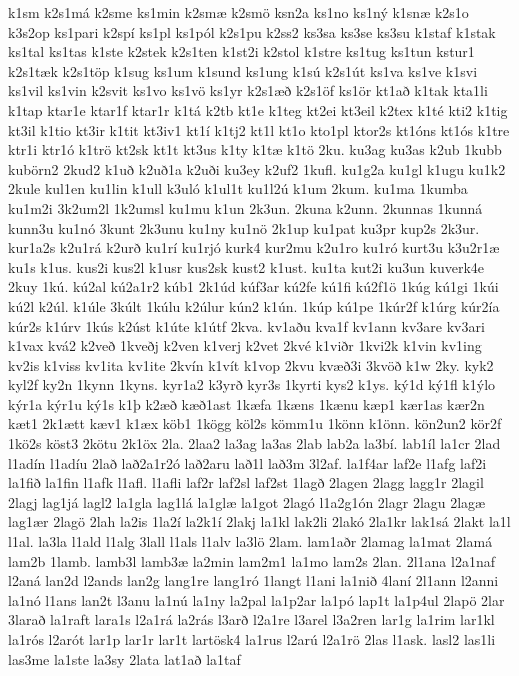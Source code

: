 {k1sm
k2s1má
k2sme
ks1min
k2smæ
k2smö
ksn2a
ks1no
ks1ný
k1snæ
k2s1o
k3s2op
ks1pari
k2spí
ks1pl
ks1pól
k2s1pu
k2ss2
ks3sa
ks3se
ks3su
k1staf
k1stak
ks1tal
ks1tas
k1ste
k2stek
k2s1ten
k1st2i
k2stol
k1stre
ks1tug
ks1tun
kstur1
k2s1tæk
k2s1töp
k1sug
ks1um
k1sund
ks1ung
k1sú
k2s1út
ks1va
ks1ve
k1svi
ks1vil
ks1vin
k2svit
ks1vo
ks1vö
ks1yr
k2s1æð
k2s1öf
ks1ör
kt1að
k1tak
kta1li
k1tap
ktar1e
ktar1f
ktar1r
k1tá
k2tb
kt1e
k1teg
kt2ei
kt3eil
k2tex
k1té
kti2
k1tig
kt3il
k1tio
kt3ir
k1tit
kt3iv1
kt1í
k1tj2
kt1l
kt1o
kto1pl
ktor2s
kt1óns
kt1ós
k1tre
ktr1i
ktr1ó
k1trö
kt2sk
kt1t
kt3us
k1ty
k1tæ
k1tö
2ku.
ku3ag
ku3as
k2ub
1kubb
kubörn2
2kud2
k1uð
k2uð1a
k2uði
ku3ey
k2uf2
1kufl.
ku1g2a
ku1gl
k1ugu
ku1k2
2kule
kul1en
ku1lin
k1ull
k3uló
k1ul1t
ku1l2ú
k1um
2kum.
ku1ma
1kumba
ku1m2i
3k2um2l
1k2umsl
ku1mu
k1un
2k3un.
2kuna
k2unn.
2kunnas
1kunná
kunn3u
ku1nó
3kunt
2k3unu
ku1ny
ku1nö
2k1up
ku1pat
ku3pr
kup2s
2k3ur.
kur1a2s
k2u1rá
k2urð
ku1rí
ku1rjó
kurk4
kur2mu
k2u1ro
ku1ró
kurt3u
k3u2r1æ
ku1s
k1us.
kus2i
kus2l
k1usr
kus2sk
kust2
k1ust.
ku1ta
kut2i
ku3un
kuverk4e
2kuy
1kú.
kú2al
kú2a1r2
kúb1
2k1úd
kúf3ar
kú2fe
kú1fi
kú2f1ö
1kúg
kú1gi
1kúi
kú2l
k2úl.
k1úle
3kúlt
1kúlu
k2úlur
kún2
k1ún.
1kúp
kú1pe
1kúr2f
k1úrg
kúr2ía
kúr2s
k1úrv
1kús
k2úst
k1úte
k1útf
2kva.
kv1aðu
kva1f
kv1ann
kv3are
kv3ari
k1vax
kvá2
k2veð
1kveðj
k2ven
k1verj
k2vet
2kvé
k1viðr
1kvi2k
k1vin
kv1ing
kv2is
k1viss
kv1ita
kv1ite
2kvín
k1vít
k1vop
2kvu
kvæð3i
3kvöð
k1w
2ky.
kyk2
kyl2f
ky2n
1kynn
1kyns.
kyr1a2
k3yrð
kyr3s
1kyrti
kys2
k1ys.
ký1d
ký1fl
k1ýlo
kýr1a
kýr1u
ký1s
k1þ
k2æð
kæð1ast
1kæfa
1kæns
1kænu
kæp1
kær1as
kær2n
kæt1
2k1ætt
kæv1
k1æx
köb1
1kögg
köl2s
kömm1u
1könn
k1önn.
kön2un2
kör2f
1kö2s
köst3
2kötu
2k1öx
2la.
2laa2
la3ag
la3as
2lab
lab2a
la3bí.
lab1íl
la1cr
2lad
l1adín
l1adíu
2lað
lað2a1r2ó
lað2aru
lað1l
lað3m
3l2af.
la1f4ar
laf2e
l1afg
laf2i
la1fið
la1fin
l1afk
l1afl.
l1afli
laf2r
laf2sl
laf2st
1lagð
2lagen
2lagg
lagg1r
2lagil
2lagj
lag1já
lagl2
la1gla
lag1lá
la1glæ
la1got
2lagó
l1a2g1ón
2lagr
2lagu
2lagæ
lag1ær
2lagö
2lah
la2is
1la2í
la2k1í
2lakj
la1kl
lak2li
2lakó
2la1kr
lak1sá
2lakt
la1l
l1al.
la3la
l1ald
l1alg
3lall
l1als
l1alv
la3lö
2lam.
lam1aðr
2lamag
la1mat
2lamá
lam2b
1lamb.
lamb3l
lamb3æ
la2min
lam2m1
la1mo
lam2s
2lan.
2l1ana
l2a1naf
l2aná
lan2d
l2ands
lan2g
lang1re
lang1ró
1langt
l1ani
la1nið
4laní
2l1ann
l2anni
la1nó
l1ans
lan2t
l3anu
la1nú
la1ny
la2pal
la1p2ar
la1pó
lap1t
la1p4ul
2lapö
2lar
3larað
la1raft
lara1s
l2a1rá
la2rás
l3arð
l2a1re
l3arel
l3a2ren
lar1g
la1rim
lar1kl
la1rós
l2arót
lar1p
lar1r
lar1t
lartösk4
la1rus
l2arú
l2a1rö
2las
l1ask.
lasl2
las1li
las3me
la1ste
la3sy
2lata
lat1að
la1taf
}
